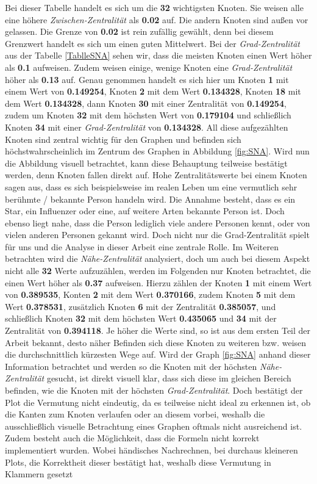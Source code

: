 \FloatBarrier
Bei dieser Tabelle handelt es sich um die \textbf{32} wichtigsten Knoten. Sie weisen alle eine höhere \textit{Zwischen-Zentralität} als \textbf{0.02} auf. Die andern Knoten sind außen vor gelassen. Die Grenze von \textbf{0.02} ist rein zufällig gewählt, denn bei diesem Grenzwert handelt es sich um einen guten Mittelwert.
Bei der \textit{Grad-Zentralität} aus der Tabelle \ref{TablleSNA} sehen wir, dass die meisten Knoten einen Wert höher als \textbf{0.1} aufweisen. Zudem weisen einige, wenige Knoten eine \textit{Grad-Zentralität} höher als \textbf{0.13} auf. Genau genommen handelt es sich hier um Knoten \textbf{1} mit einem Wert von \textbf{0.149254}, Knoten \textbf{2} mit dem Wert \textbf{0.134328}, Knoten \textbf{18} mit dem Wert \textbf{0.134328}, dann Knoten \textbf{30} mit einer Zentralität von \textbf{0.149254}, zudem um Knoten \textbf{32} mit dem höchsten Wert von \textbf{0.179104} und schließlich Knoten \textbf{34} mit einer \textit{Grad-Zentralität} von \textbf{0.134328}. All diese aufgezählten Knoten sind zentral wichtig für den Graphen und befinden sich höchstwahrscheinlich im Zentrum des Graphen in Abbildung \ref{fig:SNA}. Wird nun die Abbildung visuell betrachtet, kann diese Behauptung teilweise bestätigt werden, denn Knoten fallen direkt auf. Hohe Zentralitätswerte bei einem Knoten sagen aus, dass es sich beispielsweise im realen Leben um eine vermutlich sehr berühmte / bekannte Person handeln wird. Die Annahme besteht, dass es ein Star, ein Influenzer oder eine, auf weitere Arten bekannte Person ist. Doch ebenso liegt nahe, dass die Person lediglich viele andere Personen kennt, oder von vielen anderen Personen gekannt wird. Doch nicht nur die Grad-Zentralität spielt für uns und die Analyse in dieser Arbeit eine zentrale Rolle. Im Weiteren betrachten wird die \textit{Nähe-Zentralität}  analysiert, doch um auch bei diesem Aspekt nicht alle \textbf{32} Werte aufzuzählen, werden im Folgenden nur Knoten betrachtet, die einen Wert höher als \textbf{0.37} aufweisen. Hierzu zählen der Knoten \textbf{1} mit einem Wert von \textbf{0.389535}, Konten \textbf{2} mit dem Wert \textbf{0.370166}, zudem Knoten \textbf{5} mit dem Wert \textbf{0.378531}, zusätzlich Knoten \textbf{6} mit der Zentralität \textbf{0.385057}, und schließlich Knoten \textbf{32} mit dem höchsten Wert \textbf{0.435065} und \textbf{34} mit der Zentralität von \textbf{0.394118}. Je höher die Werte sind, so ist aus dem ersten Teil der Arbeit bekannt, desto näher Befinden sich diese Knoten zu weiteren bzw. weisen die durchschnittlich kürzesten Wege auf. Wird der Graph \ref{fig:SNA} anhand dieser Information betrachtet und werden so die Knoten mit der höchsten \textit{Nähe-Zentralität} gesucht, ist direkt visuell klar, dass sich diese im gleichen Bereich befinden, wie die Knoten mit der höchsten \textit{Grad-Zentralität}. Doch bestätigt der Plot die Vermutung nicht eindeutig, da es teilweise nicht ideal zu erkennen ist, ob die Kanten zum Knoten verlaufen oder an diesem vorbei, weshalb die ausschließlich visuelle Betrachtung eines Graphen oftmals nicht ausreichend ist. Zudem besteht auch die Möglichkeit, dass die Formeln nicht korrekt implementiert wurden. Wobei händisches Nachrechnen, bei durchaus kleineren Plots, die Korrektheit dieser bestätigt hat, weshalb diese Vermutung in Klammern gesetzt 